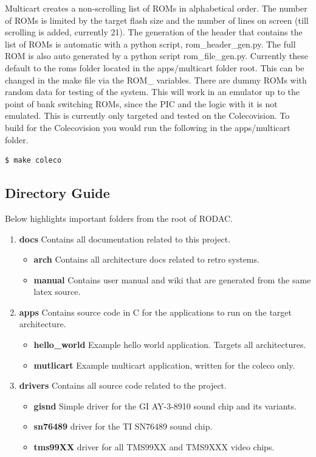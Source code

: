 \documentclass{article}
\begin{document}
  \par
  Multicart creates a non-scrolling list of ROMs in alphabetical order. The number of ROMs is limited by the target flash size and the number of
  lines on screen (till scrolling is added, currently 21). The generation of the header that contains the list of ROMs is automatic with a python
  script, rom\_header\_gen.py. The full ROM is also auto generated by a python script rom\_file\_gen.py. Currently these default to the roms folder
  located in the apps/multicart folder root. This can be changed in the make file via the ROM\_\* variables. There are dummy ROMs with random data
  for testing of the system. This will work in an emulator up to the point of bank switching ROMs, since the PIC and the logic with it is not emulated.
  This is currently only targeted and tested on the Colecovision. To build for the Colecovision you would run the following in the apps/multicart folder.

  \begin{lstlisting}[language=bash]
    $ make coleco
  \end{lstlisting}

  \subsection{Directory Guide}

  \par
  Below highlights important folders from the root of RODAC.

  \begin{enumerate}
    \item \textbf{docs} Contains all documentation related to this project.
      \begin{itemize}
        \item \textbf{arch} Contains all architecture docs related to retro systems.
        \item \textbf{manual} Contains user manual and wiki that are generated from the same latex source.
      \end{itemize}
    \item \textbf{apps} Contains source code in C for the applications to run on the target architecture.
      \begin{itemize}
        \item \textbf{hello\_world} Example hello world application. Targets all architectures.
        \item \textbf{mutlicart} Example multicart application, written for the coleco only.
      \end{itemize}
    \item \textbf{drivers} Contains all source code related to the project.
      \begin{itemize}
        \item \textbf{gisnd} Simple driver for the GI AY-3-8910 sound chip and its variants.
        \item \textbf{sn76489} driver for the TI SN76489 sound chip.
        \item \textbf{tms99XX} driver for all TMS99XX and TMS9XXX video chips.
      \end{itemize}
  \end{enumerate}
\end{document}
